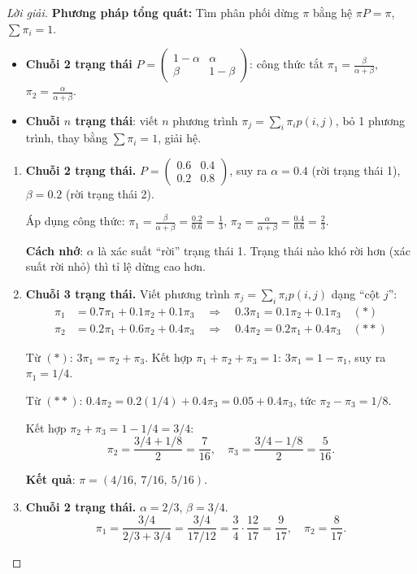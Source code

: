 \documentclass[8pt,a4paper]{article}
\newenvironment{solution}{\begin{proof}[Lời giải]}{\end{proof}}
\begin{document}
\begin{solution}
\textbf{Phương pháp tổng quát:} Tìm phân phối dừng $\pi$ bằng hệ $\pi P = \pi$, $\sum \pi_i = 1$.
\begin{itemize}
  \item \textbf{Chuỗi 2 trạng thái} $P = \begin{pmatrix} 1-\alpha & \alpha \\ \beta & 1-\beta \end{pmatrix}$: công thức tắt $\pi_1 = \frac{\beta}{\alpha+\beta}$, $\pi_2 = \frac{\alpha}{\alpha+\beta}$.
  \item \textbf{Chuỗi $n$ trạng thái}: viết $n$ phương trình $\pi_j = \sum_i \pi_i p(i,j)$, bỏ 1 phương trình, thay bằng $\sum \pi_i = 1$, giải hệ.
\end{itemize}

\begin{enumerate}[label=(\alph*)]
\item \textbf{Chuỗi 2 trạng thái.} $P = \begin{pmatrix} 0.6 & 0.4 \\ 0.2 & 0.8 \end{pmatrix}$, suy ra $\alpha = 0.4$ (rời trạng thái 1), $\beta = 0.2$ (rời trạng thái 2).

Áp dụng công thức: $\pi_1 = \frac{\beta}{\alpha+\beta} = \frac{0.2}{0.6} = \frac{1}{3}$, $\pi_2 = \frac{\alpha}{\alpha+\beta} = \frac{0.4}{0.6} = \frac{2}{3}$.

\textbf{Cách nhớ}: $\alpha$ là xác suất ``rời'' trạng thái 1. Trạng thái nào khó rời hơn (xác suất rời nhỏ) thì tỉ lệ dừng cao hơn.

\item \textbf{Chuỗi 3 trạng thái.} Viết phương trình $\pi_j = \sum_i \pi_i p(i,j)$ dạng ``cột $j$'':
\begin{align*}
  \pi_1 &= 0.7\pi_1 + 0.1\pi_2 + 0.1\pi_3 \quad \Rightarrow \quad 0.3\pi_1 = 0.1\pi_2 + 0.1\pi_3 \quad (*)\\
  \pi_2 &= 0.2\pi_1 + 0.6\pi_2 + 0.4\pi_3 \quad \Rightarrow \quad 0.4\pi_2 = 0.2\pi_1 + 0.4\pi_3 \quad (**)
\end{align*}

Từ $(*)$: $3\pi_1 = \pi_2 + \pi_3$. Kết hợp $\pi_1 + \pi_2 + \pi_3 = 1$: $3\pi_1 = 1 - \pi_1$, suy ra $\pi_1 = 1/4$.

Từ $(**)$: $0.4\pi_2 = 0.2(1/4) + 0.4\pi_3 = 0.05 + 0.4\pi_3$, tức $\pi_2 - \pi_3 = 1/8$.

Kết hợp $\pi_2 + \pi_3 = 1 - 1/4 = 3/4$:
\[
  \pi_2 = \frac{3/4 + 1/8}{2} = \frac{7}{16}, \quad \pi_3 = \frac{3/4 - 1/8}{2} = \frac{5}{16}.
\]

\textbf{Kết quả}: $\pi = (4/16,\ 7/16,\ 5/16)$.

\item \textbf{Chuỗi 2 trạng thái.} $\alpha = 2/3$, $\beta = 3/4$.
\[
  \pi_1 = \frac{3/4}{2/3 + 3/4} = \frac{3/4}{17/12} = \frac{3}{4} \cdot \frac{12}{17} = \frac{9}{17}, \quad \pi_2 = \frac{8}{17}.
\]
\end{enumerate}
\end{solution}
\end{document}
